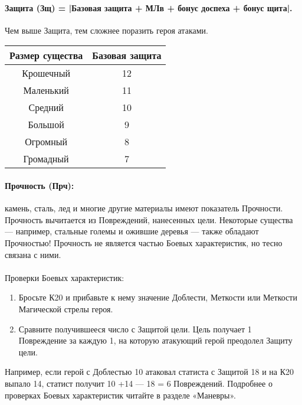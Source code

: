 \paragraph{Защита (Зщ) = |Базовая защита + МЛв + бонус доспеха + бонус щита|.} Чем выше Защита, тем сложнее поразить героя атаками.
\begin{center}
\begin{tabular}{ |c|c| }
\hline
\textbf{Размер существа} & \textbf{Базовая защита}
\\ \hline
Крошечный & 12
\\ \hline
Маленький & 11
\\ \hline
Средний & 10
\\ \hline
Большой & 9
\\ \hline
Огромный & 8
\\ \hline
Громадный & 7
\\ \hline
\end{tabular}
\end{center}
\paragraph{Прочность (Прч):} камень, сталь, лед и многие другие материалы имеют показатель Прочности. Прочность вычитается из Повреждений, нанесенных цели. Некоторые существа — например, стальные големы и ожившие деревья — также обладают Прочностью! Прочность не является частью Боевых характеристик, но тесно связана с ними.
\paragraph{}Проверки Боевых характеристик:
\begin{enumerate}
\item Бросьте К20 и прибавьте к нему значение Доблести, Меткости или Меткости Магической стрелы героя.
\item Сравните получившееся число с Защитой цели. Цель получает 1 Повреждение за каждую 1, на которую атакующий герой преодолел Защиту цели.
\end{enumerate}
Например, если герой с Доблестью 10 атаковал статиста с Защитой 18 и на К20 выпало 14, статист получит 10 +14 — 18 = 6 Повреждений.
\newline
Подробнее о проверках Боевых характеристик читайте в разделе «Маневры».
